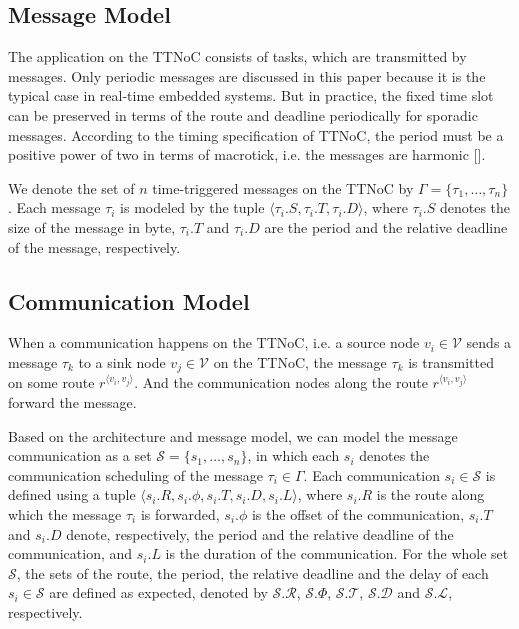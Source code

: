 \documentclass[jornal]{IEEEtran}
\newcommand{\calV}{\mathcal{V}}
\newcommand{\calL}{\mathcal{L}}
\newcommand{\calS}{\mathcal{S}}
\newcommand{\calR}{\mathcal{R}}
\newcommand{\calD}{\mathcal{D}}
\newcommand{\calT}{\mathcal{T}}
\newcommand{\route}[3]{#1^{\langle #2,#3\rangle}}
\begin{document}


\subsection{Message Model}
The application on the TTNoC consists of tasks, which are transmitted by
messages. Only periodic messages are discussed in this paper because
it is the typical case in real-time embedded systems. But in practice,
the fixed time slot can be preserved in terms of the route and
deadline periodically for sporadic messages. According to the timing
specification of TTNoC, the period must be a positive power of two in
terms of macrotick, i.e. the messages are harmonic [].

We denote the set of $n$ time-triggered messages on the TTNoC by
$\Gamma = \{\tau_{1},\dots,\tau_{n}\}$. Each message $\tau_{i}$ is
modeled by the tuple $\langle \tau_{i}.S, \tau_{i}.T,
\tau_{i}.D\rangle$, where $\tau_{i}.S$ denotes the size of the message
in byte, $\tau_{i}.T$ and $\tau_{i}.D$ are the period and the relative
deadline of the message, respectively.

\subsection{Communication Model}
When a communication happens on the TTNoC, i.e. a source node $v_i\in
\calV$ sends a message $\tau_{k}$ to a sink node $v_j\in \calV$ on the
TTNoC, the message $\tau_k$ is transmitted on some route
$\route{r}{v_i}{v_j}$.  And the communication nodes along the route
$\route{r}{v_i}{v_j}$ forward the message.

Based on the architecture and message model, we can model the message
communication as a set $\calS=\{s_1,\ldots,s_n\}$, in which each
$s_{i}$ denotes the communication scheduling of the message
$\tau_{i}\in\Gamma$. Each communication $s_{i}\in\calS$ is defined
using a tuple $\langle s_i.R, s_i.\phi, s_i.T, s_i.D, s_i.L\rangle$,
where $s_i.R$ is the route along which the message $\tau_i$ is
forwarded, $s_i.\phi$ is the offset of the communication, $s_i.T$ and
$s_i.D$ denote, respectively, the period and the relative deadline of
the communication, and $s_i.L$ is the duration of the communication.
For the whole set $\calS$, the sets of the route, the period, the
relative deadline and the delay of each $s_i\in\calS$ are defined as
expected, denoted by $\calS.\calR$, $\calS.\Phi$, $\calS.\calT$,
$\calS.\calD$ and $\calS.\calL$, respectively.
\end{document}
